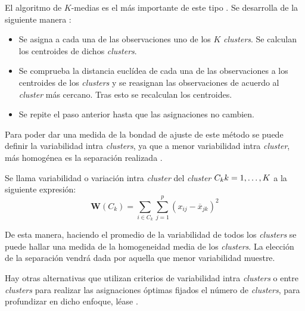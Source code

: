 \noindent El algoritmo de $K$-medias es el más importante de este tipo \cite{Johnson 2007}. Se desarrolla de la siguiente manera  :
\begin{itemize}
\item Se asigna a cada una de las observaciones  uno de los $K$ \emph{clusters}. Se calculan los centroides de dichos \emph{clusters}.
\item Se comprueba la distancia euclídea de cada una de las observaciones a los centroides de los \emph{clusters} y se reasignan las observaciones de acuerdo al \emph{cluster} más cercano. Tras esto se recalculan los centroides.
\item Se repite el paso anterior hasta que las asignaciones no cambien. 
\end{itemize}

\noindent Para poder dar una medida de la bondad de ajuste de este método se puede definir la variabilidad intra \emph{clusters}, ya que a menor variabilidad intra \emph{cluster}, más homogénea es la separación realizada \cite{Peña 2002}. 
\begin{defi}
Se llama variabilidad o variación intra \emph{cluster} del \emph{cluster} $C_k\\k=1,\ldots,K$ a la siguiente expresión:
\begin{equation}
\mathbf{W}(C_k)=\sum_{i\in C_k}\sum_{j=1}^{p} (x_{ij}-\overline{x}_{jk})^2
\end{equation}
\end{defi}

\noindent De esta manera, haciendo el promedio de la variabilidad de todos los \emph{clusters} se puede hallar una medida de la homogeneidad media de los \emph{clusters}. La elección de la separación vendrá dada por aquella que menor variabilidad muestre. 

\noindent Hay otras alternativas que utilizan criterios de variabilidad intra \emph{clusters} o entre \emph{clusters} para realizar las asignaciones óptimas fijados el número de \emph{clusters}, para profundizar en dicho enfoque, léase \cite{Everitt 2011, Peña 2002, Hartigan 1975}.







